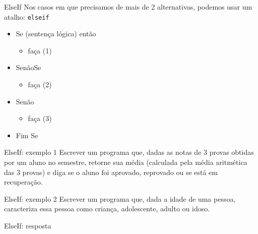 \documentclass[hyperref={pdfpagelabels=false}]{beamer}
\begin{document}
\begin{frame}{ElseIf}
   Nos casos em que precisamos de mais de 2 alternativas, podemos usar um atalho: {\texttt{elseif}}
   \begin{center}
     \begin{minipage}{0.7\textwidth}
       \begin{itemize}
       \item[] Se (sentença lógica) então
	       \begin{itemize}
	       \item[] faça (1)
	       \end{itemize}
       \item[] SenãoSe
	       \begin{itemize}
	       \item[] faça (2) 
	       \end{itemize}
		   \item[] Senão
		     \begin{itemize}
		     \item[] faça (3)
		     \end{itemize}
       \item[] Fim Se 
       \end{itemize}
     \end{minipage}
   \end{center}
\end{frame}

\begin{frame}{ElseIf: exemplo 1}
  Escrever um programa que, dadas as notas de 3 provas obtidas por um aluno no semestre, retorne sua média (calculada pela média aritmética das 3 provas) e diga se o aluno foi aprovado, reprovado ou se está em recuperação.
  \begin{center}
    \begin{minipage}{0.8\textwidth}
    \end{minipage}
  \end{center}
\end{frame}

\begin{frame}{ElseIf: exemplo 2}
  Escrever um programa que, dada a idade de uma pessoa, caracteriza essa pessoa como criança, adolescente, adulto ou idoso.
\end{frame}

\begin{frame}{ElseIf: resposta}
  \begin{center}
    \begin{minipage}{0.85\textwidth}
      
    \end{minipage}
  \end{center}
\end{frame}
\end{document}
